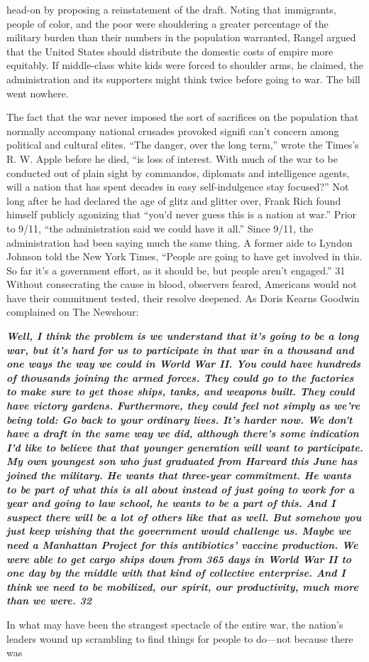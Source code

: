 head-on by proposing a reinstatement of the draft. Noting that immigrants, people of color, and the poor were shouldering a greater percentage of the military burden than their numbers in the population warranted, Rangel argued that the United States should distribute the domestic costs of empire more equitably. If middle-class white kids were forced to shoulder arms, he claimed, the administration and its supporters might think twice before going to war. The bill went nowhere.{\par} The fact that the war never imposed the sort of sacrifices on the population that normally accompany national crusades provoked signifi can't concern among political and cultural elites. “The danger, over the long term,” wrote the Times's R. W. Apple before he died, “is loss of interest. With much of the war to be conducted out of plain sight by commandos, diplomats and intelligence agents, will a nation that has spent decades in easy self-indulgence stay focused?” Not long after he had declared the age of glitz and glitter over, Frank Rich found himself publicly agonizing that “you’d never guess this is a nation at war.” Prior to 9/11, “the administration said we could have it all.” Since 9/11, the administration had been saying much the same thing. A former aide to Lyndon Johnson told the New York Times, “People are going to have get involved in this. So far it’s a government effort, as it should be, but people aren’t engaged.” {\color{blue} 31 } Without consecrating the cause in blood, observers feared, Americans would not have their commitment tested, their resolve deepened. As Doris Kearns Goodwin complained on The Newshour:{\par} {\textbf{\textit{Well, I think the problem is we understand that it’s going to be a long war, but it’s hard for us to participate in that war in a thousand and one ways the way we could in World War II. You could have hundreds of thousands joining the armed forces. They could go to the factories to make sure to get those ships, tanks, and weapons built. They could have victory gardens. Furthermore, they could feel not simply as we’re being told: Go back to your ordinary lives. It’s harder now. We don’t have a draft in the same way we did, although there’s some indication I’d like to believe that that younger generation will want to participate. My own youngest son who just graduated from Harvard this June has joined the military. He wants that three-year commitment. He wants to be part of what this is all about instead of just going to work for a year and going to law school, he wants to be a part of this. And I suspect there will be a lot of others like that as well. But somehow you just keep wishing that the government would challenge us. Maybe we need a Manhattan Project for this antibiotics' vaccine production. We were able to get cargo ships down from {\color{blue} 365 } days in World War II to one day by the middle with that kind of collective enterprise. And I think we need to be mobilized, our spirit, our productivity, much more than we were. {\color{blue} 32 } } } }{\par} In what may have been the strangest spectacle of the entire war, the nation’s leaders wound up scrambling to find things for people to do—not because there was 